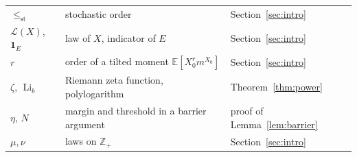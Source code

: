 \documentclass[11pt]{amsart}
\theoremstyle{remark}
\numberwithin{equation}{section}
\newcommand{\EE}{\mathbb{E}}
\newcommand{\Li}{\operatorname{Li}}
\begin{document}
\begin{center}
\begin{tabular}{l>{\raggedright\arraybackslash}p{5.2cm}l}
$\le_{\mathrm{st}}$ & stochastic order & Section~\ref{sec:intro}\\
$\mathcal L(X)$, $\mathbf 1_E$ & law of $X$, indicator of $E$ & Section~\ref{sec:intro}\\
$r$ & order of a tilted moment $\EE[X_0^rm^{X_0}]$ & Section~\ref{sec:intro}\\
$\zeta$, $\Li_b$ & Riemann zeta function, polylogarithm & Theorem~\ref{thm:power}\\
$\eta$, $N$ & margin and threshold in a barrier argument & proof of Lemma~\ref{lem:barrier}\\
$\mu,\nu$ & laws on $\mathbb Z_+$ & Section~\ref{sec:intro}\\
\bottomrule
\end{tabular}
\end{center}
\end{document}
